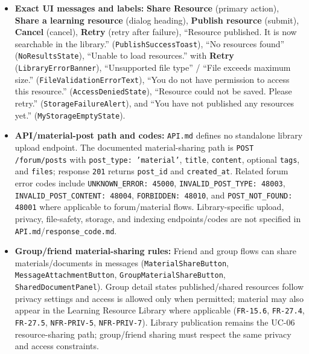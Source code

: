 \documentclass[12pt]{article}
\begin{document}
\begin{itemize}
\item \textbf{Exact UI messages and labels:} \textbf{Share Resource} (primary action), \textbf{Share a learning resource} (dialog heading), \textbf{Publish resource} (submit), \textbf{Cancel} (cancel), \textbf{Retry} (retry after failure), “Resource published. It is now searchable in the library.” (\texttt{PublishSuccessToast}), “No resources found” (\texttt{NoResultsState}), “Unable to load resources.” with \textbf{Retry} (\texttt{LibraryErrorBanner}), “Unsupported file type” / “File exceeds maximum size.” (\texttt{FileValidationErrorText}), “You do not have permission to access this resource.” (\texttt{AccessDeniedState}), “Resource could not be saved. Please retry.” (\texttt{StorageFailureAlert}), and “You have not published any resources yet.” (\texttt{MyStorageEmptyState}).
\item \textbf{API/material-post path and codes:} \texttt{API.md} defines no standalone library upload endpoint. The documented material-sharing path is \texttt{POST /forum/posts} with \texttt{post\_type: 'material'}, \texttt{title}, \texttt{content}, optional \texttt{tags}, and \texttt{files}; response \texttt{201} returns \texttt{post\_id} and \texttt{created\_at}. Related forum error codes include \texttt{UNKNOWN\_ERROR: 45000}, \texttt{INVALID\_POST\_TYPE: 48003}, \texttt{INVALID\_POST\_CONTENT: 48004}, \texttt{FORBIDDEN: 48010}, and \texttt{POST\_NOT\_FOUND: 48001} where applicable to forum/material flows. Library-specific upload, privacy, file-safety, storage, and indexing endpoints/codes are not specified in \texttt{API.md}/\texttt{response\_code.md}.
\item \textbf{Group/friend material-sharing rules:} Friend and group flows can share materials/documents in messages (\texttt{MaterialShareButton}, \texttt{MessageAttachmentButton}, \texttt{GroupMaterialShareButton}, \texttt{SharedDocumentPanel}). Group detail states published/shared resources follow privacy settings and access is allowed only when permitted; material may also appear in the Learning Resource Library where applicable (\texttt{FR-15.6}, \texttt{FR-27.4}, \texttt{FR-27.5}, \texttt{NFR-PRIV-5}, \texttt{NFR-PRIV-7}). Library publication remains the UC-06 resource-sharing path; group/friend sharing must respect the same privacy and access constraints.
\end{itemize}
\par\medskip

\hypertarget{sec:b11-source-alignment-notes}{}
\end{document}
